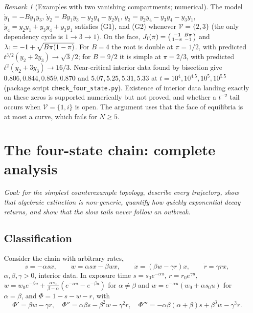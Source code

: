 \documentclass[11pt,a4paper]{article}
\theoremstyle{definition}\newtheorem{definition}[theorem]{Definition}
\theoremstyle{remark}\newtheorem{remark}[theorem]{Remark}
\newcommand{\Vs}{\mathcal V}
\begin{document}
\begin{remark}[Examples with two vanishing compartments; numerical]
\label{rem:e4}
The model $\dot y_1=-By_1y_3$, $\dot y_2=By_1y_3-y_2y_4-y_2y_1$,
$\dot y_3=y_2y_4-y_3y_4-y_3y_1$, $\dot y_4=y_2y_1+y_3y_4+y_3y_1$ satisfies
(G1), and (G2) whenever $\Vs=\{2,3\}$ (the only dependency cycle is
$1\to3\to1$). On the face,
$J_{\rm f}(\pi)=\bigl(\begin{smallmatrix}-1&B\pi\\1-\pi&-1\end{smallmatrix}\bigr)$
and $\lambda_{\rm f}=-1+\sqrt{B\pi(1-\pi)}$. For $B=4$ the root is double at
$\pi=1/2$, with predicted $t^{3/2}(y_2+2y_3)\to\sqrt3/2$; for $B=9/2$ it is
simple at $\pi=2/3$, with predicted $t^2(y_2+3y_3)\to16/3$. Near-critical
interior data found by bisection give $0.806,0.844,0.859,0.870$ and
$5.07,5.25,5.31,5.33$ at $t=10^4,10^{4.5},10^5,10^{5.5}$ (package script
\texttt{check\_four\_state.py}). Existence of interior data landing
exactly on these zeros is supported numerically but not proved, and
whether a $t^{-2}$ tail occurs when $\Vs=\{1,i\}$ is open. The argument
uses that the face of equilibria is at most a curve, which fails for
$N\ge5$.
\end{remark}


\section{The four-state chain: complete analysis}
\label{sec:chain}

\emph{Goal: for the simplest counterexample topology, describe every
trajectory, show that algebraic extinction is non-generic, quantify how
quickly exponential decay returns, and show that the slow tails never
follow an outbreak.}

\subsection{Classification}
Consider the chain with arbitrary rates,
\begin{equation}
\dot s=-\alpha sx,\qquad \dot w=\alpha sx-\beta wx,\qquad
\dot x=(\beta w-\gamma r)x,\qquad \dot r=\gamma rx,
\label{eq:generalchain}
\end{equation}
$\alpha,\beta,\gamma>0$, interior data. In exposure time
$s=s_0e^{-\alpha u}$, $r=r_0e^{\gamma u}$,
$w=w_0e^{-\beta u}+\frac{\alpha s_0}{\beta-\alpha}(e^{-\alpha u}-e^{-\beta u})$
for $\alpha\ne\beta$ and $w=e^{-\alpha u}(w_0+\alpha s_0u)$ for
$\alpha=\beta$, and $\Phi=1-s-w-r$, with
\begin{equation}
\Phi'=\beta w-\gamma r,\quad
\Phi''=\alpha\beta s-\beta^2w-\gamma^2r,\quad
\Phi'''=-\alpha\beta(\alpha+\beta)s+\beta^3w-\gamma^3r .
\label{eq:profilederivatives}
\end{equation}
\end{document}
